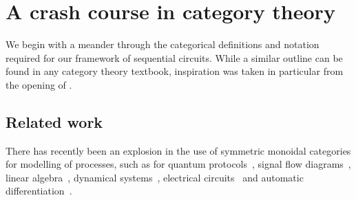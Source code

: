 \chapter{A crash course in category theory}

We begin with a meander through the categorical definitions and notation
required for our framework of sequential circuits.
While a similar outline can be found in any category theory textbook,
inspiration was taken in particular from the opening of
\cite{ghica2023hierarchical}.














\section{Related work}

There has recently been an explosion in the use of symmetric monoidal categories
for modelling of processes, such as for quantum
protocols~\cite{abramsky2004categorical}, signal flow
diagrams~\cite{bonchi2014categorical,bonchi2015full}, linear
algebra~\cite{bonchi2017interacting,zanasi2015interacting,bonchi2019graphical,boisseau2022graphical},
dynamical systems~\cite{baez2015categories,fong2016categorical}, electrical
circuits~\cite{boisseau2022string} and automatic
differentiation~\cite{alvarez-picallo2023functorial}.